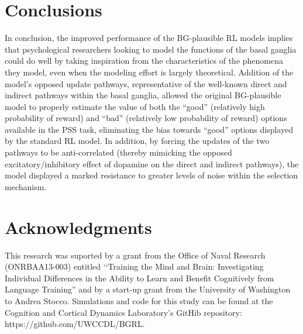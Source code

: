 \documentclass[10pt,letterpaper]{article}
\begin{document}
\section{Conclusions}

In conclusion, the improved performance of the BG-plausible RL models implies that psychological researchers looking to model the functions of the basal ganglia could do well by taking inspiration from the characteristics of the phenomena they model, even when the modeling effort is largely theoretical. Addition of the model's opposed update pathways, representative of the well-known direct and indirect pathways within the basal ganglia, allowed the original BG-plausible model to properly estimate the value of both the ``good'' (relatively high probability of reward) and ``bad'' (relatively low probability of reward) options available in the PSS task, eliminating the bias towards ``good'' options displayed by the standard RL model. In addition, by forcing the updates of the two pathways to be anti-correlated (thereby mimicking the opposed excitatory/inhibitory effect of dopamine on the direct and indirect pathways), the model displayed a marked resistance to greater levels of noise within the selection mechanism.    

\section{Acknowledgments}

This research was suported by a grant from the Office of Naval Research (ONRBAA13-003) entitled ‘‘Training the Mind and Brain: Investigating Individual Differences in the Ability to Learn and Benefit Cognitively from Language Training'' and by a start-up grant from the University of Washington to Andrea Stocco. Simulations and code for this study can be found at the Cognition and Cortical Dynamics Laboratory's GitHib repository: https://github.com/UWCCDL/BGRL.



\setlength{\bibleftmargin}{.125in}
\setlength{\bibindent}{-\bibleftmargin}


\end{document}
